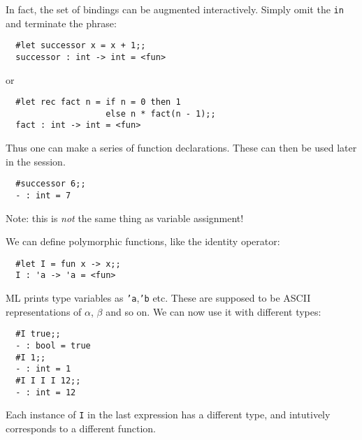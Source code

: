 \begin{slide*}


\vspace*{0.5cm}

In fact, the set of bindings can be augmented interactively. Simply omit the
{\black \tt in} and terminate the phrase:

\begin{black}
\begin{verbatim}
  #let successor x = x + 1;;
  successor : int -> int = <fun>
\end{verbatim}
\end{black}

or

\begin{black}
\begin{verbatim}
  #let rec fact n = if n = 0 then 1
                    else n * fact(n - 1);;
  fact : int -> int = <fun>
\end{verbatim}
\end{black}


Thus one can make a series of function declarations. These can then be used
later in the session.

\begin{black}
\begin{verbatim}
  #successor 6;;
  - : int = 7
\end{verbatim}
\end{black}

Note: this is {\em not} the same thing as variable assignment!

\end{slide*}



\begin{slide*}


\vspace*{0.5cm}

We can define polymorphic functions, like the identity operator:

\begin{black}
\begin{verbatim}
  #let I = fun x -> x;;
  I : 'a -> 'a = <fun>
\end{verbatim}
\end{black}

ML prints type variables as {\black \tt 'a},{\black \tt 'b} etc. These are
supposed to be ASCII representations of {\black $\alpha$}, {\black $\beta$} and
so on. We can now use it with different types:

\begin{black}
\begin{verbatim}
  #I true;;
  - : bool = true
  #I 1;;
  - : int = 1
  #I I I I 12;;
  - : int = 12
\end{verbatim}
\end{black}

Each instance of {\black \tt I} in the last expression has a different type, 
and intutively corresponds to a different function.

\end{slide*}



